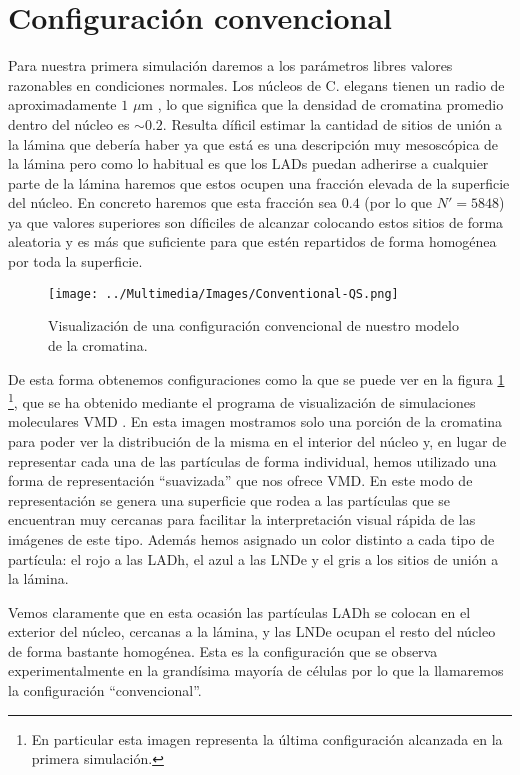 \section{Configuración convencional}

Para nuestra primera simulación daremos a los parámetros libres valores razonables en condiciones normales. Los núcleos de C. elegans tienen un radio de aproximadamente $1$ $\mu$m \cite{Ikegami2010}, lo que significa que la densidad de cromatina promedio dentro del núcleo es $\sim 0.2$. Resulta díficil estimar la cantidad de sitios de unión a la lámina que debería haber ya que está es una descripción muy mesoscópica de la lámina pero como lo habitual es que los LADs puedan adherirse a cualquier parte de la lámina haremos que estos ocupen una fracción elevada de la superficie del núcleo. En concreto haremos que esta fracción sea $0.4$ (por lo que $N'=5848$) ya que valores superiores son díficiles de alcanzar colocando estos sitios de forma aleatoria y es más que suficiente para que estén repartidos de forma homogénea por toda la superficie.

\begin{figure}[t]
    \centering
    \texttt{[image: ../Multimedia/Images/Conventional-QS.png]}
    \caption{Visualización de una configuración convencional de nuestro modelo de la cromatina.}
    \label{fig:vmd_QS_image_c}
\end{figure}

De esta forma obtenemos configuraciones como la que se puede ver en la figura \ref{fig:vmd_QS_image_c} \footnote{En particular esta imagen representa la última configuración alcanzada en la primera simulación.}, que se ha obtenido mediante el programa de visualización de simulaciones moleculares VMD \cite{Humphrey96}. En esta imagen mostramos solo una porción de la cromatina para poder ver la distribución de la misma en el interior del núcleo y, en lugar de representar cada una de las partículas de forma individual, hemos utilizado una forma de representación ``suavizada'' que nos ofrece VMD. En este modo de representación se genera una superficie que rodea a las partículas que se encuentran muy cercanas para facilitar la interpretación visual rápida de las imágenes de este tipo. Además hemos asignado un color distinto a cada tipo de partícula: el rojo a las LADh, el azul a las LNDe y el gris a los sitios de unión a la lámina.

Vemos claramente que en esta ocasión las partículas LADh se colocan en el exterior del núcleo, cercanas a la lámina, y las LNDe ocupan el resto del núcleo de forma bastante homogénea. Esta es la configuración que se observa experimentalmente en la grandísima mayoría de células \cite{Camara2023} por lo que la llamaremos la configuración ``convencional''.


